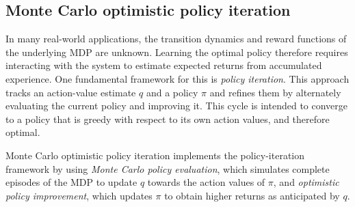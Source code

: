 \documentclass[twoside,11pt]{article}
\newcommand{\pol}{\pi}
\begin{document}
 \subsection{Monte Carlo optimistic policy iteration}

In many real-world applications, the transition dynamics and reward functions of the underlying MDP are unknown. Learning the optimal policy therefore requires interacting with the system to estimate expected returns from accumulated experience.
One fundamental framework for this is \textit{policy iteration}.
This approach tracks an action-value estimate $q$ and a policy $\pol$ and refines them by alternately evaluating the current policy and improving it.
This cycle is intended to converge to a policy that is greedy with respect to its own action values, and therefore optimal.

Monte Carlo optimistic policy iteration implements the policy-iteration framework by using 
\textit{Monte Carlo policy evaluation}, which simulates complete episodes of the MDP to update $q$ towards the action values of $\pol$,
and \textit{optimistic policy improvement}, which updates $\pol$ to obtain higher returns as anticipated by $q$.
\end{document}
